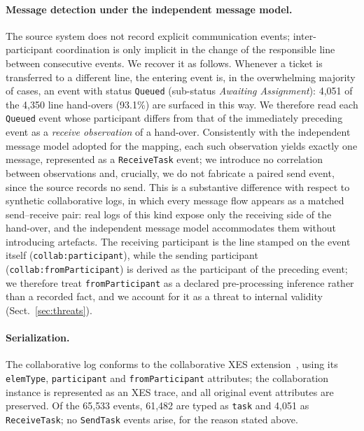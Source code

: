 \paragraph{Message detection under the independent message model.}
The source system does not record explicit communication events;
inter-participant coordination is only implicit in the change of the
responsible line between consecutive events. We recover it as follows.
Whenever a ticket is transferred to a different line, the entering event is,
in the overwhelming majority of cases, an event with status \texttt{Queued}
(sub-status \emph{Awaiting Assignment}): 4{,}051 of the 4{,}350 line
hand-overs (93.1\%) are surfaced in this way. We therefore read each
\texttt{Queued} event whose participant differs from that of the immediately
preceding event as a \emph{receive observation} of a hand-over. Consistently
with the independent message model adopted for the mapping, each such
observation yields exactly one message, represented as a \texttt{ReceiveTask}
event; we introduce no correlation between observations and, crucially, we do
not fabricate a paired send event, since the source records no send. This is
a substantive difference with respect to synthetic collaborative logs, in
which every message flow appears as a matched send--receive pair: real logs
of this kind expose only the receiving side of the hand-over, and the
independent message model accommodates them without introducing artefacts.
The receiving participant is the line stamped on the event itself
(\texttt{collab:participant}), while the sending participant
(\texttt{collab:fromParticipant}) is derived as the participant of the
preceding event; we therefore treat \texttt{fromParticipant} as a declared
pre-processing inference rather than a recorded fact, and we account for it
as a threat to internal validity (Sect.~\ref{sec:threats}).

\paragraph{Serialization.}
The collaborative log conforms to the collaborative XES
extension~\citep{delgado2025collab}, using its \texttt{elemType},
\texttt{participant} and \texttt{fromParticipant} attributes; the
collaboration instance is represented as an XES trace, and all original event
attributes are preserved. Of the 65{,}533 events, 61{,}482 are typed as
\texttt{task} and 4{,}051 as \texttt{ReceiveTask}; no \texttt{SendTask}
events arise, for the reason stated above.

